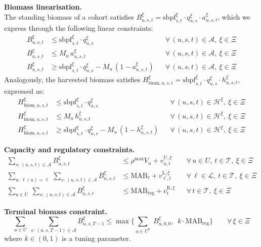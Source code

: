 \documentclass[12pt,a4paper]{article}
\begin{document}
 
\noindent \textbf{Biomass linearisation.} \\
The standing biomass of a cohort satisfies $B^\xi_{u,s,t} = \mathrm{sbpf}^\xi_{s,t} \cdot q^\xi_{u,s} \cdot a^\xi_{u,s,t}$, which we express through the following linear constraints:
\begin{align}
  B^\xi_{u,s,t} &\leq \mathrm{sbpf}^\xi_{s,t} \cdot q^\xi_{u,s}
    && \forall\, (u,s,t) \in \mathcal{A},\ \xi \in \Xi \\
  B^\xi_{u,s,t} &\leq M_u\, a^\xi_{u,s,t}
    && \forall\, (u,s,t) \in \mathcal{A},\ \xi \in \Xi \\
  B^\xi_{u,s,t} &\geq \mathrm{sbpf}^\xi_{s,t} \cdot q^\xi_{u,s}
    - M_u\,(1 - a^\xi_{u,s,t})
    && \forall\, (u,s,t) \in \mathcal{A},\ \xi \in \Xi 
\end{align}
Analogously, the harvested biomass satisfies $H^\xi_{\mathrm{biom},u,s,t} = \mathrm{sbpf}^\xi_{s,t} \cdot q^\xi_{u,s} \cdot h^\xi_{u,s,t}$, expressed as:
\begin{align}
  H^\xi_{\mathrm{biom},u,s,t} &\leq \mathrm{sbpf}^\xi_{s,t} \cdot q^\xi_{u,s}
    && \forall\, (u,s,t) \in \mathcal{H}^\xi,\ \xi \in \Xi \\
  H^\xi_{\mathrm{biom},u,s,t} &\leq M_u\, h^\xi_{u,s,t}
    && \forall\, (u,s,t) \in \mathcal{H}^\xi,\ \xi \in \Xi \\
  H^\xi_{\mathrm{biom},u,s,t} &\geq \mathrm{sbpf}^\xi_{s,t} \cdot q^\xi_{u,s}
    - M_u\,(1 - h^\xi_{u,s,t})
    && \forall\, (u,s,t) \in \mathcal{H}^\xi,\ \xi \in \Xi 
\end{align}
 
 
\noindent \textbf{Capacity and regulatory constraints.}
\begin{align}
  \sum_{s:\,(u,s,t)\in\mathcal{A}} B^\xi_{u,s,t}
    &\leq \rho^{\max} V_u + v^{\mathrm{U},\xi}_{u,t}
    && \forall\, u \in U,\ t \in \mathcal{T},\ \xi \in \Xi \label{eq:C7s}\\
  \sum_{u:\,\ell(u)=\ell}\ \sum_{s:\,(u,s,t)\in\mathcal{A}} B^\xi_{u,s,t}
    &\leq \mathrm{MAB}_\ell + v^{\mathrm{L},\xi}_{\ell,t}
    && \forall\, \ell \in \mathcal{L},\ t \in \mathcal{T},\ \xi \in \Xi \label{eq:C8s}\\
  \sum_{u \in U}\ \sum_{s:\,(u,s,t)\in\mathcal{A}} B^\xi_{u,s,t}
    &\leq \mathrm{MAB}_{\mathrm{reg}} + v^{\mathrm{R},\xi}_{t}
    && \forall\, t \in \mathcal{T},\ \xi \in \Xi \label{eq:C9s}
\end{align}
 
 
\noindent \textbf{Terminal biomass constraint.}
\begin{equation}
  \sum_{u \in U}\;\sum_{s:\,(u,s,T{-}1)\in\mathcal{A}} B^\xi_{u,s,T-1}
    \leq \max \Big\{\sum_{u \in U^0}\;B^\xi_{u,0,0}, \ \  k \cdot \mathrm{MAB}_{\mathrm{reg}}\Big\}
  \qquad \forall\, \xi \in \Xi  \label{eq:C10}
\end{equation}
where $k \in (0,1)$ is a tuning parameter.
 
\end{document}
